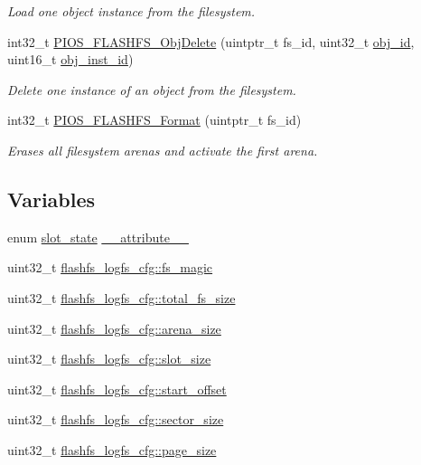 \begin{DoxyCompactItemize}
\begin{DoxyCompactList}\small\item\em \-Load one object instance from the filesystem. \end{DoxyCompactList}\item 
int32\-\_\-t \hyperlink{group___p_i_o_s___f_l_a_s_h_f_s_ga93a9e7b90c573b3784dd52781bf11e93}{\-P\-I\-O\-S\-\_\-\-F\-L\-A\-S\-H\-F\-S\-\_\-\-Obj\-Delete} (uintptr\-\_\-t fs\-\_\-id, uint32\-\_\-t \hyperlink{pios__flashfs__logfs_8c_a4901f00431a2c948153bd4f187fce556}{obj\-\_\-id}, uint16\-\_\-t \hyperlink{pios__flashfs__logfs_8c_a7930e82075aa4e3326ad9615090b5d61}{obj\-\_\-inst\-\_\-id})
\begin{DoxyCompactList}\small\item\em \-Delete one instance of an object from the filesystem. \end{DoxyCompactList}\item 
int32\-\_\-t \hyperlink{group___p_i_o_s___f_l_a_s_h_f_s_ga9dccc10d534e33e6b52df18f60d27a58}{\-P\-I\-O\-S\-\_\-\-F\-L\-A\-S\-H\-F\-S\-\_\-\-Format} (uintptr\-\_\-t fs\-\_\-id)
\begin{DoxyCompactList}\small\item\em \-Erases all filesystem arenas and activate the first arena. \end{DoxyCompactList}\end{DoxyCompactItemize}
\subsection*{\-Variables}
\begin{DoxyCompactItemize}
\item 
enum \hyperlink{group___p_i_o_s___f_l_a_s_h_f_s_ga7df58e5fca7cec32767a0481da453e74}{slot\-\_\-state} \hyperlink{group___p_i_o_s___f_l_a_s_h_f_s_ga043afd6646bf00b1155399e12818f798}{\-\_\-\-\_\-attribute\-\_\-\-\_\-}
\item 
uint32\-\_\-t \hyperlink{group___p_i_o_s___f_l_a_s_h_f_s_ga1fe17f8582e422dfe871844653d7d6f9}{flashfs\-\_\-logfs\-\_\-cfg\-::fs\-\_\-magic}
\item 
uint32\-\_\-t \hyperlink{group___p_i_o_s___f_l_a_s_h_f_s_ga36ee534fa25bdd1bece22e997e3ba800}{flashfs\-\_\-logfs\-\_\-cfg\-::total\-\_\-fs\-\_\-size}
\item 
uint32\-\_\-t \hyperlink{group___p_i_o_s___f_l_a_s_h_f_s_ga838dc01d5c7c1796252597dbb2d1dc04}{flashfs\-\_\-logfs\-\_\-cfg\-::arena\-\_\-size}
\item 
uint32\-\_\-t \hyperlink{group___p_i_o_s___f_l_a_s_h_f_s_gac9f1463cfe49a3b517bf6c1e44bbb087}{flashfs\-\_\-logfs\-\_\-cfg\-::slot\-\_\-size}
\item 
uint32\-\_\-t \hyperlink{group___p_i_o_s___f_l_a_s_h_f_s_ga2a71336371b265bddac688b27ebcb94c}{flashfs\-\_\-logfs\-\_\-cfg\-::start\-\_\-offset}
\item 
uint32\-\_\-t \hyperlink{group___p_i_o_s___f_l_a_s_h_f_s_ga8251b6447774f97389ec08c71e1ed54b}{flashfs\-\_\-logfs\-\_\-cfg\-::sector\-\_\-size}
\item 
uint32\-\_\-t \hyperlink{group___p_i_o_s___f_l_a_s_h_f_s_ga28ddda808f37b1e0a2d6e8ea25c47c59}{flashfs\-\_\-logfs\-\_\-cfg\-::page\-\_\-size}
\end{DoxyCompactItemize}


